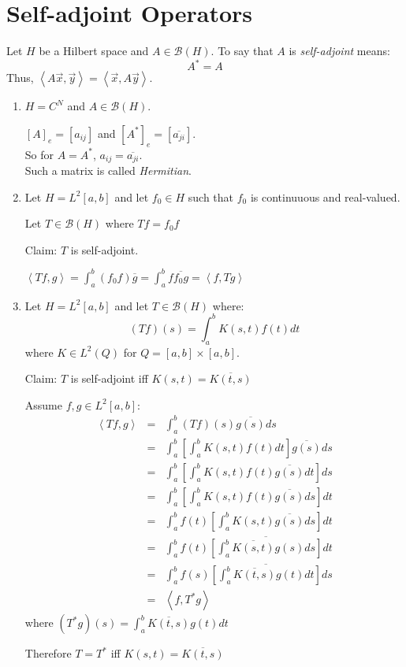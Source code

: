 \documentclass[letterpaper,12pt,fleqn]{article}
\newcommand{\mb}{\mathcal{B}}
\newcommand{\inner}[1]{\left<#1\right>}
\newcommand{\conj}[1]{\overline{#1}}
\newcommand{\vx}{\vec{x}}
\newcommand{\vy}{\vec{y}}
\begin{document}
\section*{Self-adjoint Operators}

\begin{definition}
  Let $H$ be a Hilbert space and $A\in\mb(H)$. To say that $A$ is
  \emph{self-adjoint} means:
  \[A^*=A\]
  Thus, $\inner{A\vx,\vy}=\inner{\vx,A\vy}$.
\end{definition}

\begin{examples}
  \listbreak
  \begin{enumerate}
  \item $H=C^N$ and $A\in\mb(H)$.

    $[A]_e=[a_{ij}]$ and $[A^*]_e=[\conj{a_{ji}}]$. \\
    So for $A=A^*$, $a_{ij}=\conj{a_{ji}}$. \\
    Such a matrix is called \emph{Hermitian}.

  \item Let $H=L^2[a,b]$ and let $f_0\in H$ such that $f_0$ is continuuous and
    real-valued.
    
    Let $T\in\mb(H)$ where $Tf=f_0f$

    Claim: $T$ is self-adjoint.

    $\inner{Tf,g}=\int_a^b(f_0f)\conj{g}=\int_a^bf\conj{f_0g}=\inner{f,Tg}$

  \item Let $H=L^2[a,b]$ and let $T\in\mb(H)$ where:
    \[(Tf)(s)=\int_a^bK(s,t)f(t)dt\]
    where $K\in L^2(Q)$ for $Q=[a,b]\times[a,b]$.

    Claim: $T$ is self-adjoint iff $K(s,t)=\conj{K(t,s)}$

    Assume $f,g\in L^2[a,b]$:
    \begin{eqnarray*}
      \inner{Tf,g} &=& \int_a^b(Tf)(s)\conj{g(s)}ds \\
      &=& \int_a^b\left[\int_a^bK(s,t)f(t)dt\right]\conj{g(s)}ds \\
      &=& \int_a^b\left[\int_a^bK(s,t)f(t)\conj{g(s)}dt\right]ds \\
      &=& \int_a^b\left[\int_a^bK(s,t)f(t)\conj{g(s)}ds\right]dt \\
      &=& \int_a^bf(t)\left[\int_a^bK(s,t)\conj{g(s)}ds\right]dt \\
      &=& \int_a^bf(t)\conj{\left[\int_a^b\conj{K(s,t)}g(s)ds\right]}dt \\
      &=& \int_a^bf(s)\conj{\left[\int_a^b\conj{K(t,s)}g(t)dt\right]}ds \\
      &=& \inner{f,T^*g}
    \end{eqnarray*}
    where $(T^*g)(s)=\int_a^b\conj{K(t,s)}g(t)dt$

    Therefore $T=T^*$ iff $K(s,t)=\conj{K(t,s)}$
  \end{enumerate}
\end{examples}
\end{document}
